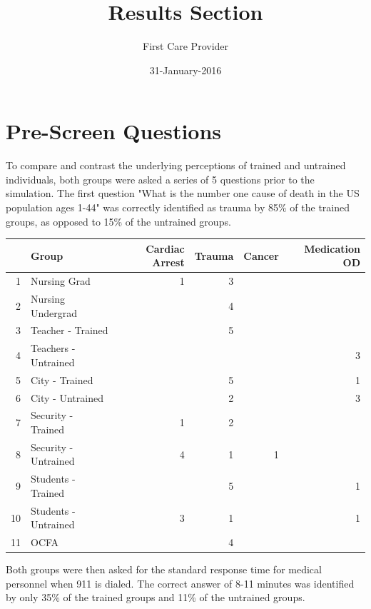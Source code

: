\documentclass{article}
\title{Results Section}
\author{First Care Provider}
\date{31-January-2016}
\begin{document}
\maketitle
\graphicspath{ {../Plots/} }

\section{Pre-Screen Questions}
To compare and contrast the underlying perceptions of trained and untrained individuals,
both groups were asked a series of 5 questions prior to the simulation. The first question 
"What is the number one cause of death in the US population ages 1-44" was correctly identified
as trauma by 85\% of the trained groups, as opposed to 15\% of the untrained groups.

\begin{table}[ht]
\centering
\begin{tabular}{rlrrrr}
  \hline
 & Group & Cardiac Arrest & Trauma & Cancer & Medication OD \\
  \hline
1 & Nursing Grad &   1 &   3 &  &  \\
  2 & Nursing Undergrad &  &   4 &  &  \\
  3 & Teacher - Trained &  &   5 &  &  \\
  4 & Teachers - Untrained &  &  &  &   3 \\
  5 & City - Trained &  &   5 &  &   1 \\
  6 & City - Untrained &  &   2 &  &   3 \\
  7 & Security - Trained &   1 &   2 &  &  \\
  8 & Security - Untrained &   4 &   1 &   1 &  \\
  9 & Students - Trained &  &   5 &  &   1 \\
  10 & Students - Untrained &   3 &   1 &  &   1 \\
  11 & OCFA &  &   4 &  &  \\
   \hline
\end{tabular}
\end{table}

Both groups were then asked for the standard response time for medical personnel when 911 is 
dialed. The correct answer of 8-11 minutes was identified by only 35\% of the trained groups and 
11\% of the untrained groups.
\end{document}
